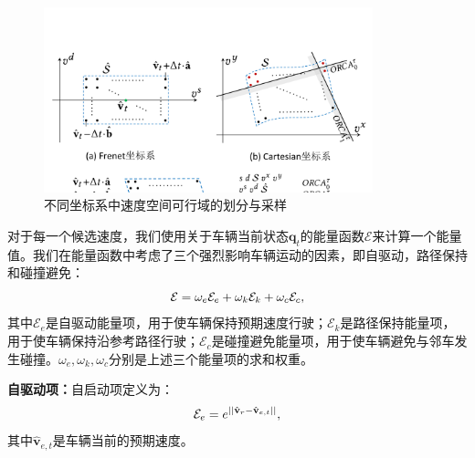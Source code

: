 \begin{figure}[!tbh]
\centering
\includegraphics[width=0.85\textwidth]{figure/reversing/velocity space v2.pdf}
\caption[不同坐标系中速度空间可行域的划分与采样]{
不同坐标系中速度空间可行域的划分与采样
}
\label{fig:reversing_velspace}
\end{figure}

对于每一个候选速度，我们使用关于车辆当前状态$\textbf{q}_{t}$的能量函数$\mathcal{E}$来计算一个能量值。我们在能量函数中考虑了三个强烈影响车辆运动的因素，即自驱动，路径保持和碰撞避免：
\begin{equation}
\setlength\abovedisplayskip{10pt}
\setlength\belowdisplayskip{10pt}
\label{eq:reversing_totenergy}
    \mathcal{E} = \omega_{e}\mathcal{E}_{e} + \omega_{k}\mathcal{E}_{k} + \omega_{c}\mathcal{E}_{c},
\end{equation}
其中$\mathcal{E}_{e}$是自驱动能量项，用于使车辆保持预期速度行驶；$\mathcal{E}_{k}$是路径保持能量项，用于使车辆保持沿参考路径行驶；$\mathcal{E}_{c}$是碰撞避免能量项，用于使车辆避免与邻车发生碰撞。$\omega_{e}, \omega_{k}, \omega_{c}$分别是上述三个能量项的求和权重。

\textbf{自驱动项：}自启动项定义为：
\begin{equation}
\setlength\abovedisplayskip{10pt}
\setlength\belowdisplayskip{10pt}
\label{eq:reversing_selfmotive}
    \mathcal{E}_{e} = e^{|| \hat{\textbf{v}}_{r} - \hat{\textbf{v}}_{e,t} ||},
\end{equation}
其中$\hat{\textbf{v}}_{e,t}$是车辆当前的预期速度。

